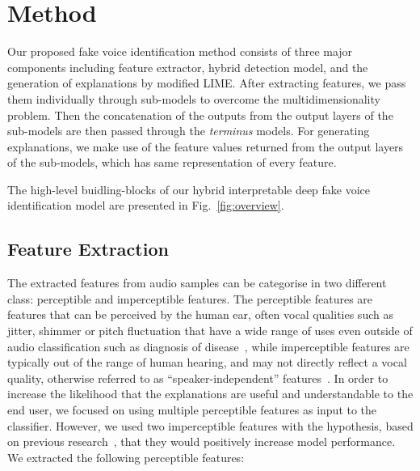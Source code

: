 \documentclass{article}
\begin{document}
\section{Method}\label{sec:method}
Our proposed fake voice identification method consists of three major components including feature extractor, hybrid detection model, and the generation of explanations by modified LIME. After extracting features, we pass them individually through sub-models to overcome the multidimensionality problem. Then the concatenation of the outputs from the output layers of the sub-models are then passed through the \textit{terminus} models. For generating explanations, we make use of the feature values returned from the output layers of the sub-models, which has same representation of every feature. 

The high-level buidling-blocks of our hybrid interpretable deep fake voice identification model are presented in Fig.~\ref{fig:overview}.

\subsection{Feature Extraction}
The extracted features from audio samples can be categorise in two different class: perceptible and imperceptible features. The perceptible features are features that can be perceived by the human ear, often vocal qualities such as jitter, shimmer or pitch fluctuation that have a wide range of uses even outside of audio classification such as diagnosis of disease~\cite{chaiwongyen_deepfake-speech_2023}, while imperceptible features are typically out of the range of human hearing, and may not directly reflect a vocal quality, otherwise referred to as ``speaker-independent'' features~\cite{liu_hidden--wave_2023}. In order to increase the likelihood that the explanations are useful and understandable to the end user, we focused on using multiple perceptible features as input to the classifier. However, we used two imperceptible features with the hypothesis, based on previous research~\cite{barrington_single_2023,chaiwongyen_contribution_2022,chaiwongyen_deepfake-speech_2023,li_comparative_2022}, that they would positively increase model performance. We extracted the following perceptible features:
\end{document}
